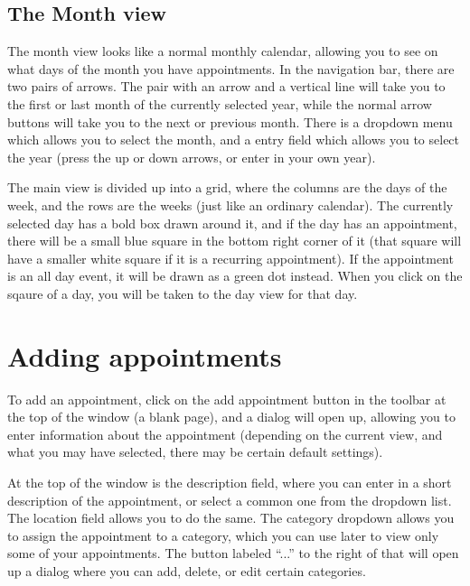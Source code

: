 \documentclass[12pt,letterpaper,oneside, openany]{book} \usepackage[latin1] {inputenc}
\begin{document}
\subsection{The Month view}

The month view looks like a normal monthly calendar, allowing you to see on what days of the month you have appointments. In the navigation bar, there are two pairs of arrows. The pair with an arrow and a vertical line will take you to the first or last month of the currently selected year, while the normal arrow buttons will take you to the next or previous month. There is a dropdown menu which allows you to select the month, and a entry field which allows you to select the year (press the up or down arrows, or enter in your own year). 

The main view is divided up into a grid, where the columns are the days of the week, and the rows are the weeks (just like an ordinary calendar). The currently selected day has a bold box drawn around it, and if the day has an appointment, there will be a small blue square in the bottom right corner of it (that square will have a smaller white square if it is a recurring appointment). If the appointment is an all day event, it will be drawn as a green dot instead. When you click on the sqaure of a day, you will be taken to the day view for that day. 


\section{Adding appointments}

To add an appointment, click on the add appointment button in the toolbar at the top of the window (a blank page), and a dialog will open up, allowing you to enter information about the appointment (depending on the current view, and what you may have selected, there may be certain default settings). 

At the top of the window is the description field, where you can enter in a short description of the appointment, or select a common one from the dropdown list. The location field allows you to do the same. The category dropdown allows you to assign the appointment to a category, which you can use later to view only some of your appointments. The button labeled ``...'' to the right of that will open up a dialog where you can add, delete, or edit certain categories. 
\end{document}
